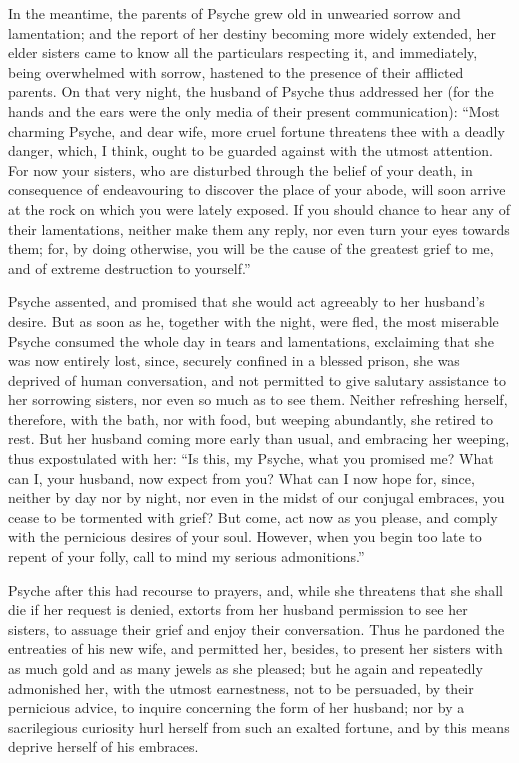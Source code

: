 \documentclass[12pt]{article}
\begin{document}
In the meantime, the parents of Psyche grew old in unwearied sorrow and
lamentation; and the report of her destiny becoming more widely extended, her
elder sisters came to know all the particulars respecting it, and immediately,
being overwhelmed with sorrow, hastened to the presence of their afflicted
parents. On that very night, the husband of Psyche thus addressed her (for the
hands and the ears were the only media of their present communication): ``Most
charming Psyche, and dear wife, more cruel fortune threatens thee with a deadly
danger, which, I think, ought to be guarded against with the utmost attention.
For now your sisters, who are disturbed through the belief of your death, in
consequence of endeavouring to discover the place of your abode, will soon
arrive at the rock on which you were lately exposed. If you should chance to
hear any of their lamentations, neither make them any reply, nor even turn your
eyes towards them; for, by doing otherwise, you will be the cause of the
greatest grief to me, and of extreme destruction to yourself.''

Psyche assented, and promised that she would act agreeably to her husband's
desire. But as soon as he, together with the night, were fled, the most
miserable Psyche consumed the whole day in tears and lamentations, exclaiming
that she was now entirely lost, since, securely confined in a blessed prison,
she was deprived of human conversation, and not permitted to give salutary
assistance to her sorrowing sisters, nor even so much as to see them. Neither
refreshing herself, therefore, with the bath, nor with food, but weeping
abundantly, she retired to rest. But her husband coming more early than usual,
and embracing her weeping, thus expostulated with her: ``Is this, my Psyche,
what you promised me? What can I, your husband, now expect from you? What can I
now hope for, since, neither by day nor by night, nor even in the midst of our
conjugal embraces, you cease to be tormented with grief? But come, act now as
you please, and comply with the pernicious desires of your soul. However, when
you begin too late to repent of your folly, call to mind my serious
admonitions.''

Psyche after this had recourse to prayers, and, while she threatens that she
shall die if her request is denied, extorts from her husband permission to see
her sisters, to assuage their grief and enjoy their conversation. Thus he
pardoned the entreaties of his new wife, and permitted her, besides, to present
her sisters with as much gold and as many jewels as she pleased; but he again
and repeatedly admonished her, with the utmost earnestness, not to be
persuaded, by their pernicious advice, to inquire concerning the form of her
husband; nor by a sacrilegious curiosity hurl herself from such an exalted
fortune, and by this means deprive herself of his embraces.
\end{document}
